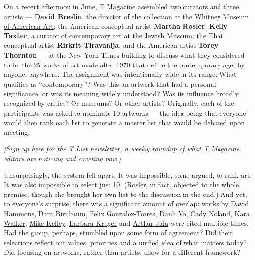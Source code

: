 On a recent afternoon in June, T Magazine assembled two curators and
three artists --- \textbf{David Breslin}, the director of the collection
at the
\href{https://www.nytimes.com/topic/organization/whitney-museum-of-american-art}{Whitney
Museum of American Art}; the American conceptual artist \textbf{Martha
Rosler}; \textbf{Kelly Taxter}, a curator of contemporary art at the
\href{https://www.nytimes.com/topic/organization/jewish-museum-nyc}{Jewish
Museum}; the Thai conceptual artist \textbf{Rirkrit Tiravanija}; and the
American artist \textbf{Torey Thornton} --- at the New York Times
building to discuss what they considered to be the 25 works of art made
after 1970 that define the contemporary age, by anyone, anywhere. The
assignment was intentionally wide in its range: What qualifies as
``contemporary''? Was this an artwork that had a personal significance,
or was its meaning widely understood? Was its influence broadly
recognized by critics? Or museums? Or other artists? Originally, each of
the participants was asked to nominate 10 artworks --- the idea being
that everyone would then rank each list to generate a master list that
would be debated upon meeting.

\emph{{[}}\href{https://www.nytimes.com/newsletters/t-list?module=inline}{\emph{Sign
up here}} \emph{for the T List newsletter, a weekly roundup of what T
Magazine editors are noticing and coveting now.{]}}

Unsurprisingly, the system fell apart. It was impossible, some argued,
to rank art. It was also impossible to select just 10. (Rosler, in fact,
objected to the whole premise, though she brought her own list to the
discussion in the end.) And yet, to everyone's surprise, there was a
significant amount of overlap: works by
\href{https://www.nytimes.com/2016/03/25/arts/design/david-hammons-is-still-messing-with-what-art-means.html}{David
Hammons},
\href{https://www.mariangoodman.com/artists/dara-birnbaum}{Dara
Birnbaum},
\href{https://www.nytimes.com/2017/05/11/t-magazine/art/felix-gonzalez-torres-zwirner-new-york-show.html}{Felix
Gonzalez-Torres},
\href{https://www.nytimes.com/2018/06/12/t-magazine/danh-vo-pho-recipe.html}{Danh
Vo}, \href{https://gagosian.com/artists/cady-noland/}{Cady Noland},
\href{https://www.nytimes.com/2016/06/09/t-magazine/art/kara-walker-father-larry-art.html}{Kara
Walker},
\href{https://www.nytimes.com/2017/03/08/t-magazine/art/mike-kelley-mobile-homestead.html}{Mike
Kelley},
\href{https://www.nytimes.com/2017/09/15/t-magazine/art/barbara-kruger-berlin.html}{Barbara
Kruger} and
\href{https://gavinbrown.biz/artists/arthur_jafa/exhibitions/2019}{Arthur
Jafa} were cited multiple times. Had the group, perhaps, stumbled upon
some form of agreement? Did their selections reflect our values,
priorities and a unified idea of what matters today? Did focusing on
artworks, rather than artists, allow for a different framework?

